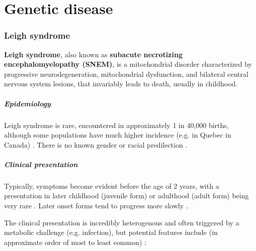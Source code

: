 \chapter{Genetic disease}
\subsection{Leigh syndrome}

\textbf{Leigh syndrome}, also known as \textbf{subacute necrotizing encephalomyelopathy (SNEM)}, is a mitochondrial disorder characterized by progressive neurodegeneration, mitochondrial dysfunction, and bilateral central nervous system lesions, that invariably leads to death, usually in childhood.

\paragraph{Epidemiology}

Leigh syndrome is rare, encountered in approximately 1 in 40,000 births, although some populations have much higher incidence (e.g. in Quebec in Canada) . There is no known gender or racial predilection .

\paragraph{Clinical presentation}

Typically, symptoms become evident before the age of 2 years, with a presentation in later childhood (juvenile form) or adulthood (adult form) being very rare . Later onset forms tend to progress more slowly .

The clinical presentation is incredibly heterogenous and often triggered by a metabolic challenge (e.g. infection), but potential features include (in approximate order of most to least common) :

